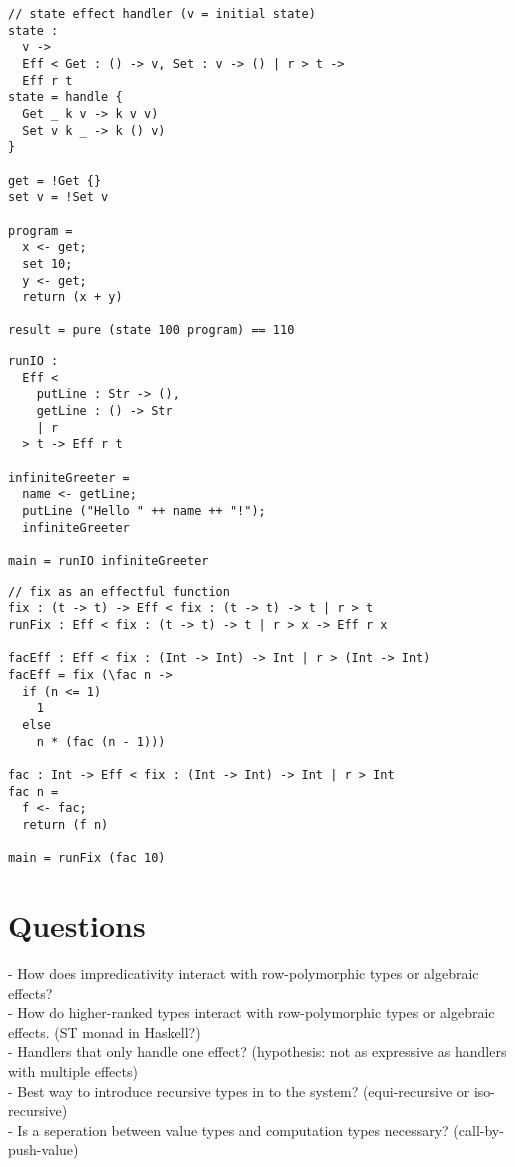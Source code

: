 \documentclass[12pt]{article}
\begin{document}
\newpage
\begin{lstlisting}[caption=State effect]
// state effect handler (v = initial state)
state :
  v ->
  Eff < Get : () -> v, Set : v -> () | r > t ->
  Eff r t
state = handle {
  Get _ k v -> k v v)
  Set v k _ -> k () v)
}

get = !Get {}
set v = !Set v

program =
  x <- get;
  set 10;
  y <- get;
  return (x + y)

result = pure (state 100 program) == 110
\end{lstlisting}

\begin{lstlisting}[caption=IO effects]
runIO :
  Eff <
    putLine : Str -> (),
    getLine : () -> Str
    | r
  > t -> Eff r t

infiniteGreeter =
  name <- getLine;
  putLine ("Hello " ++ name ++ "!");
  infiniteGreeter

main = runIO infiniteGreeter
\end{lstlisting}

\newpage
\begin{lstlisting}[caption=Recursion effect]
// fix as an effectful function
fix : (t -> t) -> Eff < fix : (t -> t) -> t | r > t
runFix : Eff < fix : (t -> t) -> t | r > x -> Eff r x 

facEff : Eff < fix : (Int -> Int) -> Int | r > (Int -> Int)
facEff = fix (\fac n ->
  if (n <= 1)
    1
  else
    n * (fac (n - 1)))

fac : Int -> Eff < fix : (Int -> Int) -> Int | r > Int
fac n =
  f <- fac;
  return (f n)

main = runFix (fac 10)
\end{lstlisting}

\newpage
\section{Questions}
- How does impredicativity interact with row-polymorphic types or algebraic effects? \\
- How do higher-ranked types interact with row-polymorphic types or algebraic effects. (ST monad in Haskell?) \\
- Handlers that only handle one effect? (hypothesis: not as expressive as handlers with multiple effects) \\
- Best way to introduce recursive types in to the system? (equi-recursive or iso-recursive) \\
- Is a seperation between value types and computation types necessary? (call-by-push-value) \\
\end{document}

